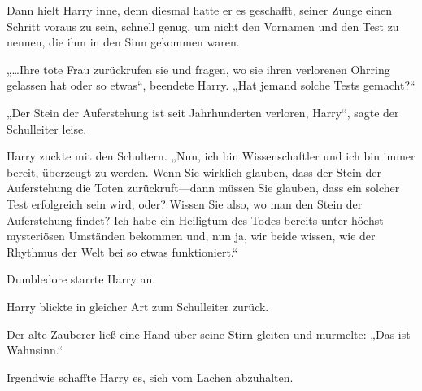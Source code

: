Dann hielt Harry inne, denn diesmal hatte er es geschafft, seiner Zunge einen Schritt voraus zu sein, schnell genug, um nicht den Vornamen und den Test zu nennen, die ihm in den Sinn gekommen waren.

„…Ihre tote Frau zurückrufen sie und fragen, wo sie ihren verlorenen Ohrring gelassen hat oder so etwas“, beendete Harry. „Hat jemand solche Tests gemacht?“

„Der Stein der Auferstehung ist seit Jahrhunderten verloren, Harry“, sagte der Schulleiter leise.

Harry zuckte mit den Schultern. „Nun, ich bin Wissenschaftler und ich bin immer bereit, überzeugt zu werden. Wenn Sie wirklich glauben, dass der Stein der Auferstehung die Toten zurückruft—dann müssen Sie glauben, dass ein solcher Test erfolgreich sein wird, oder? Wissen Sie also, wo man den Stein der Auferstehung findet? Ich habe ein Heiligtum des Todes bereits unter höchst mysteriösen Umständen bekommen und, nun ja, wir beide wissen, wie der Rhythmus der Welt bei so etwas funktioniert.“

Dumbledore starrte Harry an.

Harry blickte in gleicher Art zum Schulleiter zurück.

Der alte Zauberer ließ eine Hand über seine Stirn gleiten und murmelte: „Das ist Wahnsinn.“

Irgendwie schaffte Harry es, sich vom Lachen abzuhalten.

